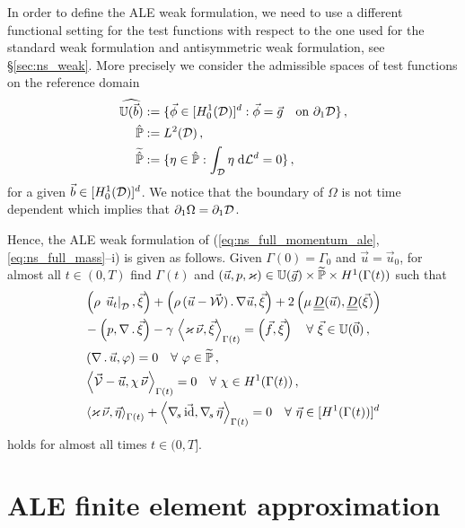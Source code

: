In order to define the ALE weak formulation, we need to use a different
functional setting for the test functions with respect to the one used for the
standard weak formulation and antisymmetric weak formulation, see
\S\ref{sec:ns_weak}. More precisely we consider the admissible spaces of test
functions on the reference domain
\begin{align*}
\widehat{\mathbb{U}(\vec{b})} &:= \{\vec \phi\in[H^1_0(\mathcal D)]^d:\vec \phi =\vec
g\quad \mbox{on }\partial_1\mathcal D\}\,,\\
\hat{\mathbb{P}} &:= L^2(\mathcal D)\,,\\
\widetilde{\hat{\mathbb{P}}} &:= \{\eta\in\hat{\mathbb{P}} : \int_\mathcal D\eta\;{\rm d}{\cal L}^{d}=0 \}\,,
\end{align*}
for a given $\vec b \in [H^1_0(\mathcal D)]^d$. We notice that the boundary
of $\Omega$ is not time dependent which implies that
$\partial_1\Omega=\partial_1\mathcal D$.

Hence, the ALE weak formulation of (\ref{eq:ns_full_momentum_ale},
\ref{eq:ns_full_mass}--i) is given as follows. Given $\Gamma(0) = \Gamma_0$ and
$\vec u = \vec u_0$, for almost all $t\in(0,T)$ find $\Gamma(t)$ and ${(\vec u,
p, \varkappa)\in \mathbb{U}(\vec{g}) \times \widetilde{\mathbb{P}} \times H^1(\Gamma(t))}$
such that
\begin{subequations}
\begin{align}
& \left(\rho\,\left.\vec u_t\right|_{\D}, \vec \xi\right) +
\left(\rho\,(\vec u - \W)\,.\, \nabla \vec u,\vec \xi\right)
+ 2\left(\mu\,\mat D(\vec u), \mat D(\vec \xi)\right) \nonumber \\
& - \left(p, \nabla\,.\,\vec \xi\right)
- \gamma\,\left\langle \varkappa\,\vec\nu, \vec\xi\right\rangle_{\Gamma(t)}
= \left(\vec f, \vec \xi\right)\quad \forall\ \vec\xi \in \uspace 0 \,,
\label{eq:ns_weaka_ale}\\
& \left(\nabla\,.\,\vec u, \varphi\right) = 0
\quad \forall\ \varphi \in \pnormspace\,, \label{eq:ns_weakb_ale} \\
&  \left\langle \V
- \vec u, \chi\,\vec\nu \right\rangle_{\Gamma(t)} = 0
\quad \forall\ \chi \in H^1(\Gamma(t))\,, \label{eq:ns_weakc_ale} \\
& \left\langle \varkappa\,\vec\nu, \vec\eta \right\rangle_{\Gamma(t)}
+ \left\langle \nabs\,\vec \id, \nabs\,\vec \eta \right\rangle_{\Gamma(t)}
= 0  \quad \forall\ \vec\eta \in [H^1(\Gamma(t))]^d\,\label{eq:ns_weakd_ale}
\end{align}
\end{subequations}
holds for almost all times $t \in (0,T]$.

\section{ALE finite element approximation}\label{sec:ale_fem}

